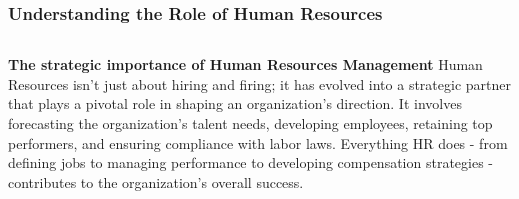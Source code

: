 \documentclass[5pt]{beamer}
\begin{document}
\begin{frame}
\frametitle{Understanding the Role of Human Resources}
\begin{columns}
\begin{column}{0.7\textwidth}
\begin{block}{\textbf{The strategic importance of Human Resources Management}}
Human Resources isn't just about hiring and firing; it has evolved into a strategic partner that plays a pivotal role in shaping an organization's direction. It involves forecasting the organization's talent needs, developing employees, retaining top performers, and ensuring compliance with labor laws. Everything HR does - from defining jobs to managing performance to developing compensation strategies - contributes to the organization's overall success.
\end{block}
\end{column}
\end{columns}
\end{frame}
\end{document}
